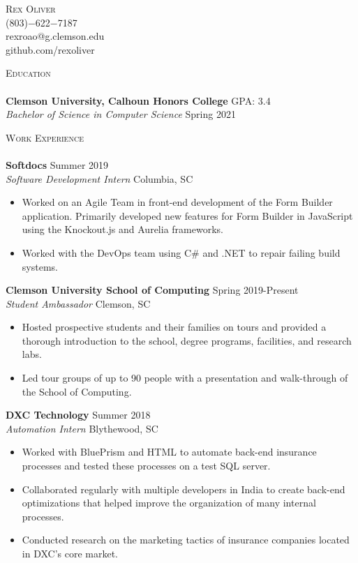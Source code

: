 \documentclass[a4paper]{article}
\newcommand{\lineunder} {
    \vspace*{-8pt} \\
    \hspace*{-18pt} \hrulefill \\
}
\newcommand{\header} [1] {
    {\hspace*{-18pt}\vspace*{6pt} \textsc{#1}}
    \vspace*{-6pt} \lineunder
}
\newcommand{\contact} [4] {
    \vspace*{-10pt}
    \begin{center}
        {\huge \scshape {#1}}\\
        #2 \\ #3 \\ #4
    \end{center}
    \vspace*{-8pt}
}
\newcommand{\beginninglist} [4] {
	
	\noindent \textbf{#1} \hfill \hfill #3\\ \noindent \textit{#2} \hfill \hfill #4 \\    
}
\begin{document}
\vspace*{-40pt}

\contact {Rex Oliver}{(803)$-$622$-$7187}{rexroao@g.clemson.edu}{github.com/rexoliver}

\header {Education}
\beginninglist {Clemson University, Calhoun Honors College} {Bachelor of Science in Computer Science} {GPA: 3.4} {Spring 2021} \vspace{3pt}

\header {Work Experience}
\beginninglist {Softdocs} {Software Development Intern} {Summer 2019} {Columbia, SC} \vspace{-8pt}
\begin{itemize}
	\item Worked on an Agile Team in front-end development of the Form Builder application. Primarily developed new features for Form Builder in JavaScript using the Knockout.js and Aurelia frameworks. \vspace{-5pt}
	\item Worked with the DevOps team using C\# and .NET to repair failing build systems. \vspace{-5pt}
\end{itemize}	
\beginninglist {Clemson University School of Computing} {Student Ambassador} {Spring 2019-Present} {Clemson, SC} \vspace{-8pt}
\begin{itemize}
	\item Hosted prospective students and their families on tours and provided a thorough introduction to the school, degree programs, facilities, and research labs.\vspace{-5pt}
	\item Led tour groups of up to 90 people with a presentation and walk-through of the School of Computing. \vspace{-5pt}
\end{itemize}	
\beginninglist {DXC Technology} {Automation Intern} {Summer 2018} {Blythewood, SC} \vspace{-8pt}
\begin{itemize}
	\item Worked with BluePrism and HTML to automate back-end insurance processes and tested these processes on a test SQL server.\vspace{-5pt}
	\item Collaborated regularly with multiple developers in India to create back-end optimizations that helped improve the organization of many internal processes.\vspace{-5pt}
	\item Conducted research on the marketing tactics of insurance companies located in DXC's core market.\vspace{-5pt}
\end{itemize}
\end{document}
